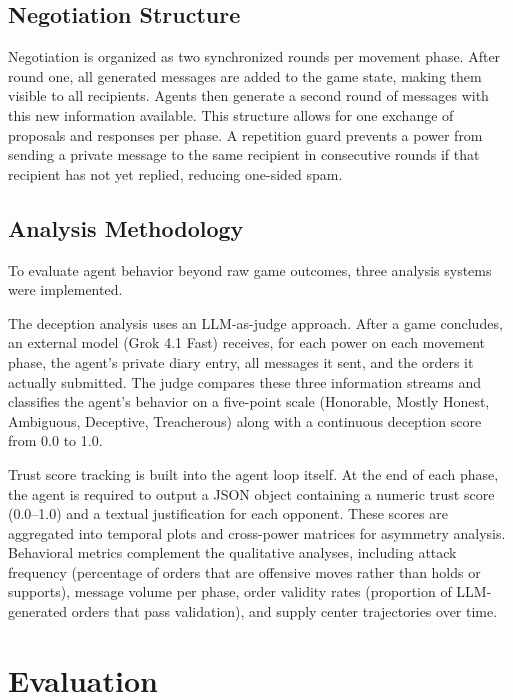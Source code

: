 \documentclass[a4paper,oneside,bibliography=totoc]{scrartcl}
\begin{document}
\subsection{Negotiation Structure}

Negotiation is organized as two synchronized rounds per movement phase. After round one, all generated messages are added to the game state, making them visible to all recipients. Agents then generate a second round of messages with this new information available. This structure allows for one exchange of proposals and responses per phase. A repetition guard prevents a power from sending a private message to the same recipient in consecutive rounds if that recipient has not yet replied, reducing one-sided spam.

\subsection{Analysis Methodology}
\enlargethispage{\baselineskip}

To evaluate agent behavior beyond raw game outcomes, three analysis systems were implemented.

The deception analysis uses an LLM-as-judge approach. After a game concludes, an external model (Grok 4.1 Fast) receives, for each power on each movement phase, the agent's private diary entry, all messages it sent, and the orders it actually submitted. The judge compares these three information streams and classifies the agent's behavior on a five-point scale (Honorable, Mostly Honest, Ambiguous, Deceptive, Treacherous) along with a continuous deception score from 0.0 to 1.0.

Trust score tracking is built into the agent loop itself. At the end of each phase, the agent is required to output a JSON object containing a numeric trust score (0.0--1.0) and a textual justification for each opponent. These scores are aggregated into temporal plots and cross-power matrices for asymmetry analysis. Behavioral metrics complement the qualitative analyses, including attack frequency (percentage of orders that are offensive moves rather than holds or supports), message volume per phase, order validity rates (proportion of LLM-generated orders that pass validation), and supply center trajectories over time.

\section{Evaluation}
\end{document}
